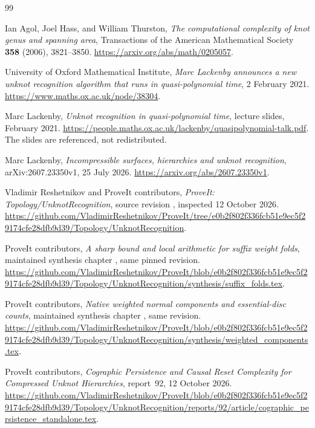 \begin{thebibliography}{99}
\raggedright
{}
Ian Agol, Joel Hass, and William Thurston,
\emph{The computational complexity of knot genus and spanning area},
Transactions of the American Mathematical Society \textbf{358} (2006),
3821--3850.
\url{https://arxiv.org/abs/math/0205057}.

University of Oxford Mathematical Institute,
\emph{Marc Lackenby announces a new unknot recognition algorithm that runs
in quasi-polynomial time}, 2 February 2021.
\url{https://www.maths.ox.ac.uk/node/38304}.

Marc Lackenby,
\emph{Unknot recognition in quasi-polynomial time},
lecture slides, February 2021.
\url{https://people.maths.ox.ac.uk/lackenby/quasipolynomial-talk.pdf}.
The slides are referenced, not redistributed.

Marc Lackenby,
\emph{Incompressible surfaces, hierarchies and unknot recognition},
arXiv:2607.23350v1, 25 July 2026.
\url{https://arxiv.org/abs/2607.23350v1}.

Vladimir Reshetnikov and ProveIt contributors,
\emph{ProveIt: Topology/UnknotRecognition},
source revision \BaseCommit, inspected 12 October 2026.
\url{https://github.com/VladimirReshetnikov/ProveIt/tree/e0b2f802f336fcb51e9ec5f29174cfe28dfb9d39/Topology/UnknotRecognition}.

ProveIt contributors,
\emph{A sharp bound and local arithmetic for suffix weight folds},
maintained synthesis chapter , same pinned revision.
\url{https://github.com/VladimirReshetnikov/ProveIt/blob/e0b2f802f336fcb51e9ec5f29174cfe28dfb9d39/Topology/UnknotRecognition/synthesis/suffix_folds.tex}.

ProveIt contributors,
\emph{Native weighted normal components and essential-disc counts},
maintained synthesis chapter , same revision.
\url{https://github.com/VladimirReshetnikov/ProveIt/blob/e0b2f802f336fcb51e9ec5f29174cfe28dfb9d39/Topology/UnknotRecognition/synthesis/weighted_components.tex}.

ProveIt contributors,
\emph{Cographic Persistence and Causal Reset Complexity for Compressed
Unknot Hierarchies}, report~92, 12 October 2026.
\url{https://github.com/VladimirReshetnikov/ProveIt/blob/e0b2f802f336fcb51e9ec5f29174cfe28dfb9d39/Topology/UnknotRecognition/reports/92/article/cographic_persistence_standalone.tex}.


\end{thebibliography}
